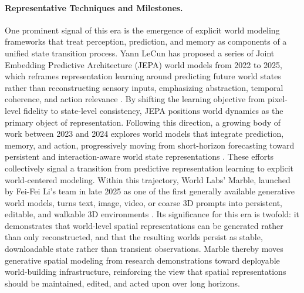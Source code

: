 \paragraph{Representative Techniques and Milestones.}
One prominent signal of this era is the emergence of explicit world modeling frameworks that treat perception, prediction, and memory as components of a unified state transition process.
Yann LeCun has proposed a series of Joint Embedding Predictive Architecture (JEPA) world models from 2022 to 2025, which reframes representation learning around predicting future world states rather than reconstructing sensory inputs, emphasizing abstraction, temporal coherence, and action relevance \cite{assran2023jepa,assran2025vjepa,chen2025vl}.
By shifting the learning objective from pixel-level fidelity to state-level consistency, JEPA positions world dynamics as the primary object of representation.
Following this direction, a growing body of work between 2023 and 2024 explores world models that integrate prediction, memory, and action, progressively moving from short-horizon forecasting toward persistent and interaction-aware world state representations \cite{hafner2023mastering,hao2023reasoning,zhen20243d,yang2026mindjourney,garcin2026beyond}.
These efforts collectively signal a transition from predictive representation learning to explicit world-centered modeling.
Within this trajectory, World Labs' Marble, launched by Fei-Fei Li's team in late 2025 as one of the first generally available generative world models, turns text, image, video, or coarse 3D prompts into persistent, editable, and walkable 3D environments \cite{Feifei2025Marble}.
Its significance for this era is twofold: it demonstrates that world-level spatial representations can be generated rather than only reconstructed, and that the resulting worlds persist as stable, downloadable state rather than transient observations.
Marble thereby moves generative spatial modeling from research demonstrations toward deployable world-building infrastructure, reinforcing the view that spatial representations should be maintained, edited, and acted upon over long horizons.






